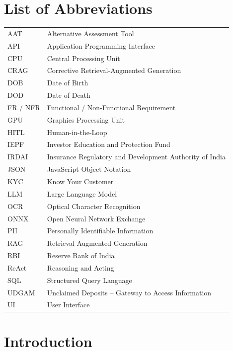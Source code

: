 \documentclass[12pt,a4paper,oneside]{report}
\begin{document}
\chapter*{List of Abbreviations}
\thispagestyle{frontmatter}
\begin{tabular}{@{}p{2.8cm}l@{}}
AAT & Alternative Assessment Tool \\
API & Application Programming Interface \\
CPU & Central Processing Unit \\
CRAG & Corrective Retrieval-Augmented Generation \\
DOB & Date of Birth \\
DOD & Date of Death \\
FR / NFR & Functional / Non-Functional Requirement \\
GPU & Graphics Processing Unit \\
HITL & Human-in-the-Loop \\
IEPF & Investor Education and Protection Fund \\
IRDAI & Insurance Regulatory and Development Authority of India \\
JSON & JavaScript Object Notation \\
KYC & Know Your Customer \\
LLM & Large Language Model \\
OCR & Optical Character Recognition \\
ONNX & Open Neural Network Exchange \\
PII & Personally Identifiable Information \\
RAG & Retrieval-Augmented Generation \\
RBI & Reserve Bank of India \\
ReAct & Reasoning and Acting \\
SQL & Structured Query Language \\
UDGAM & Unclaimed Deposits -- Gateway to Access Information \\
UI & User Interface \\
\end{tabular}

\clearpage
\ClearShipoutPictureBG
\pagestyle{mainbody}
\chapter{Introduction}
\end{document}
